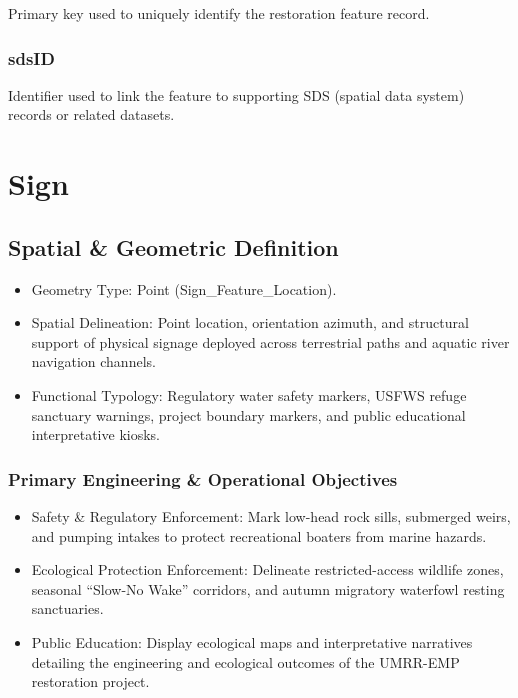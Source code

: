 \documentclass[
  letterpaper,
  DIV=11,
  numbers=noendperiod]{scrreprt}
\begin{document}
Primary key used to uniquely identify the restoration feature record.

\subsection{sdsID}\label{sdsid-23}

Identifier used to link the feature to supporting SDS (spatial data
system) records or related datasets.

\chapter{Sign}\label{sign}

\section{Spatial \& Geometric
Definition}\label{spatial-geometric-definition-24}

\begin{itemize}
\item
  Geometry Type: Point (Sign\_Feature\_Location).
\item
  Spatial Delineation: Point location, orientation azimuth, and
  structural support of physical signage deployed across terrestrial
  paths and aquatic river navigation channels.
\item
  Functional Typology: Regulatory water safety markers, USFWS refuge
  sanctuary warnings, project boundary markers, and public educational
  interpretative kiosks.
\end{itemize}

\subsection{Primary Engineering \& Operational
Objectives}\label{primary-engineering-operational-objectives-5}

\begin{itemize}
\item
  Safety \& Regulatory Enforcement: Mark low-head rock sills, submerged
  weirs, and pumping intakes to protect recreational boaters from marine
  hazards.
\item
  Ecological Protection Enforcement: Delineate restricted-access
  wildlife zones, seasonal ``Slow-No Wake'' corridors, and autumn
  migratory waterfowl resting sanctuaries.
\item
  Public Education: Display ecological maps and interpretative
  narratives detailing the engineering and ecological outcomes of the
  UMRR-EMP restoration project.
\end{itemize}
\end{document}
